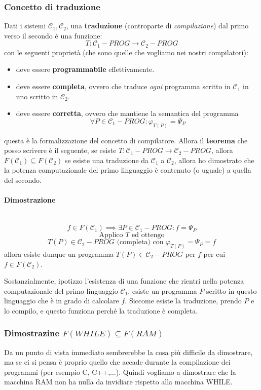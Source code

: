 \documentclass{article}
\begin{document}
\subsubsection{Concetto di traduzione}
Dati i sistemi $\mathcal{C}_1,\mathcal{C}_2$, una \textbf{traduzione} (controparte di \textit{compilazione}) dal primo verso il secondo è
una funzione:
$$T:\mathcal{C}_1-PROG\rightarrow\mathcal{C}_2-PROG$$
con le seguenti proprietà (che sono quelle che vogliamo nei nostri compilatori):
\begin{itemize}
    \item deve essere \textbf{programmabile} effettivamente.
    \item deve essere \textbf{completa}, ovvero che traduce \textit{ogni} programma scritto in $\mathcal{C}_1$ in
          uno scritto in $\mathcal{C}_2$.
    \item deve essere \textbf{corretta}, ovvero che mantiene la semantica del programma
          $$\forall P\in\mathcal{C}_1-PROG :\varphi_{T(P)}=\Psi_P$$
\end{itemize}
questa è la formalizzazione del concetto di compilatore. Allora il \textbf{teorema} che posso scrivere
è il seguente, se esiste $T:\mathcal{C}_1-PROG\rightarrow\mathcal{C}_2-PROG$, allora $F(\mathcal{C}_1)\subseteq F(\mathcal{C}_2)$
se esiste una traduzione da $\mathcal{C}_1$ a $\mathcal{C}_2$, allora ho dimostrato che la potenza computazionale del
primo linguaggio è contenuto (o uguale) a quella del secondo.

\paragraph{Dimostrazione}\mbox{}\\
$$f\in F(\mathcal{C}_1)\implies\exists P\in\mathcal{C}_1-PROG:f=\Psi_P$$
$$\text{Applico } T \text{ ed ottengo}$$
$$T(P)\in\mathcal{C}_2-PROG\text{ (completa) con }\varphi_{T(P)}=\Psi_P=f$$
allora esiste dunque un programma $T(P)\in\mathcal{C}_2-PROG$ per $f$ per cui
$f\in F(\mathcal{C}_2)$.

Sostanzialmente, ipotizzo l'esistenza di una funzione che rientri nella potenza computazionale
del primo linguaggio $\mathcal{C}_1$,
esiste un programma $P$ scritto in questo linguaggio che è in grado di calcolare $f$.
Siccome esiste la traduzione, prendo $P$ e lo compilo, e questo funziona perché la traduzione è completa.

\subsubsection{Dimostrazine $F(WHILE)\subseteq F(RAM)$}
Da un punto di vista immediato sembrerebbe la cosa più difficile da dimostrare, ma se ci si pensa
è proprio quello che accade durante la compilazione dei programmi (per esempio C, C++,...).
Quindi vogliamo a dimostrare che la macchina RAM non ha nulla da invidiare rispetto alla macchina WHILE.
\end{document}
